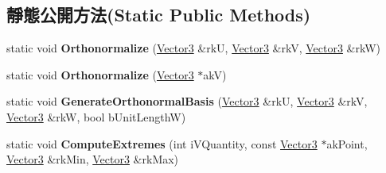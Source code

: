 \subsection*{靜態公開方法(Static Public Methods)}
\begin{DoxyCompactItemize}
\item 
static void {\bfseries Orthonormalize} (\hyperlink{class_i_dream_sky_1_1_vector3}{Vector3} \&rkU, \hyperlink{class_i_dream_sky_1_1_vector3}{Vector3} \&rkV, \hyperlink{class_i_dream_sky_1_1_vector3}{Vector3} \&rkW)\hypertarget{class_i_dream_sky_1_1_vector3_a2f792fd0d649347c7e493e528ee951ad}{}\label{class_i_dream_sky_1_1_vector3_a2f792fd0d649347c7e493e528ee951ad}

\item 
static void {\bfseries Orthonormalize} (\hyperlink{class_i_dream_sky_1_1_vector3}{Vector3} $\ast$akV)\hypertarget{class_i_dream_sky_1_1_vector3_a357d259609192b66951443d44cf7465b}{}\label{class_i_dream_sky_1_1_vector3_a357d259609192b66951443d44cf7465b}

\item 
static void {\bfseries Generate\+Orthonormal\+Basis} (\hyperlink{class_i_dream_sky_1_1_vector3}{Vector3} \&rkU, \hyperlink{class_i_dream_sky_1_1_vector3}{Vector3} \&rkV, \hyperlink{class_i_dream_sky_1_1_vector3}{Vector3} \&rkW, bool b\+Unit\+LengthW)\hypertarget{class_i_dream_sky_1_1_vector3_a96048a1ede33a929b0d3d2dc88691a02}{}\label{class_i_dream_sky_1_1_vector3_a96048a1ede33a929b0d3d2dc88691a02}

\item 
static void {\bfseries Compute\+Extremes} (int i\+V\+Quantity, const \hyperlink{class_i_dream_sky_1_1_vector3}{Vector3} $\ast$ak\+Point, \hyperlink{class_i_dream_sky_1_1_vector3}{Vector3} \&rk\+Min, \hyperlink{class_i_dream_sky_1_1_vector3}{Vector3} \&rk\+Max)\hypertarget{class_i_dream_sky_1_1_vector3_a67053a6081dde2abc53c34a7a29d968b}{}\label{class_i_dream_sky_1_1_vector3_a67053a6081dde2abc53c34a7a29d968b}

\end{DoxyCompactItemize}
